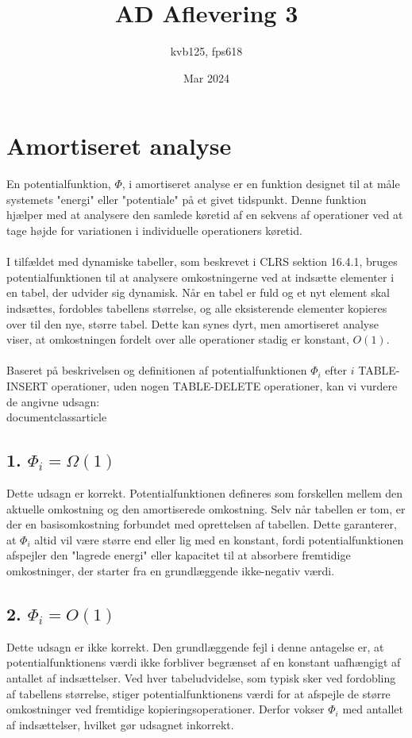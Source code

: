 \documentclass{article}
\title{AD Aflevering 3}
\author{kvb125, fps618}
\date{Mar 2024}
\begin{document}
\maketitle

\section{Amortiseret analyse}
En potentialfunktion, $\Phi$, i amortiseret analyse er en funktion designet til at måle systemets "energi" eller "potentiale" på et givet tidspunkt. Denne funktion hjælper med at analysere den samlede køretid af en sekvens af operationer ved at tage højde for variationen i individuelle operationers køretid.
\\
\\
I tilfældet med dynamiske tabeller, som beskrevet i CLRS sektion 16.4.1, bruges potentialfunktionen til at analysere omkostningerne ved at indsætte elementer i en tabel, der udvider sig dynamisk. Når en tabel er fuld og et nyt element skal indsættes, fordobles tabellens størrelse, og alle eksisterende elementer kopieres over til den nye, større tabel. Dette kan synes dyrt, men amortiseret analyse viser, at omkostningen fordelt over alle operationer stadig er konstant, $O(1)$.
\\
\\
Baseret på beskrivelsen og definitionen af potentialfunktionen $\Phi_i$ efter $i$ TABLE-INSERT operationer, uden nogen TABLE-DELETE operationer, kan vi vurdere de angivne udsagn:
\\documentclass{article}


\subsection*{1. $\Phi_i = \Omega(1)$}
Dette udsagn er korrekt. Potentialfunktionen defineres som forskellen mellem den aktuelle omkostning og den amortiserede omkostning. Selv når tabellen er tom, er der en basisomkostning forbundet med oprettelsen af tabellen. Dette garanterer, at $\Phi_i$ altid vil være større end eller lig med en konstant, fordi potentialfunktionen afspejler den "lagrede energi" eller kapacitet til at absorbere fremtidige omkostninger, der starter fra en grundlæggende ikke-negativ værdi.

\subsection*{2. $\Phi_i = O(1)$}
Dette udsagn er ikke korrekt. Den grundlæggende fejl i denne antagelse er, at potentialfunktionens værdi ikke forbliver begrænset af en konstant uafhængigt af antallet af indsættelser. Ved hver tabeludvidelse, som typisk sker ved fordobling af tabellens størrelse, stiger potentialfunktionens værdi for at afspejle de større omkostninger ved fremtidige kopieringsoperationer. Derfor vokser $\Phi_i$ med antallet af indsættelser, hvilket gør udsagnet inkorrekt.
\end{document}
